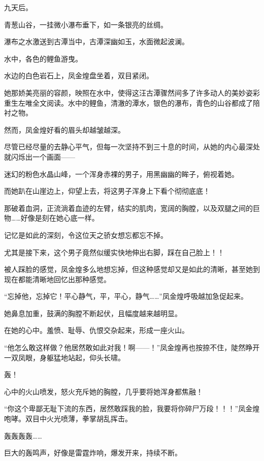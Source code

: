 
\begin{this_body}

九天后。

青葱山谷，一挂微小瀑布垂下，如一条银亮的丝绸。

瀑布之水激送到古潭当中，古潭深幽如玉，水面微起波澜。

水中，各色的鲤鱼游曳。

水边的白色岩石上，凤金煌盘坐着，双目紧闭。

她那娇美亮丽的容颜，映照在水中，使得这汪古潭骤然间多了许多动人的美妙姿彩重生左唯全文阅读。水中的鲤鱼，清澈的潭水，银色的瀑布，青色的山谷都成了陪衬之物。

然而，凤金煌好看的眉头却越皱越深。

尽管已经尽量的去静心平气，但每一次坚持不到三十息的时间，从她的内心最深处就闪烁出一个画面——

迷幻的粉色水晶山峰，一个浑身赤裸的男子，用黑幽幽的眸子，俯视着她。

而她趴在山崖边上，仰望上去，将这男子浑身上下看个彻彻底底！

那破着血洞，正流淌着血迹的左臂，结实的肌肉，宽阔的胸膛，以及双腿之间的巨物……好像是刻在她心底一样。

记忆是如此的深刻，令这位天之骄女想忘都忘不掉。

尤其是接下来，这个男子竟然似缓实快地伸出右脚，踩在自己脸上！！

被人踩脸的感觉，凤金煌多么地想忘掉，但这种感觉却又是如此的清晰，甚至她到现在都能清晰地回忆出那种感觉。

“忘掉他，忘掉它！平心静气，平，平心，静气……”凤金煌呼吸越加急促起来。

她鼻息加重，鼓满的胸膛不断起伏，且幅度越来越明显。

在她的心中。羞愤、耻辱、仇恨交杂起来，形成一座火山。

“他怎么敢这样做？他居然敢如此对我！啊——！”凤金煌再也按捺不住，陡然睁开一双凤眼，身躯猛地站起，仰头长啸。

轰！

心中的火山喷发，怒火充斥她的胸膛，几乎要将她浑身都焦融！

“你这个卑鄙无耻下流的东西，居然敢踩我的脸，我要将你碎尸万段！！！”凤金煌咆哮。双目中火光喷薄，拳掌胡乱挥击。

轰轰轰轰……

巨大的轰鸣声，好像是雷霆炸响，爆发开来，持续不断。


\end{this_body}
